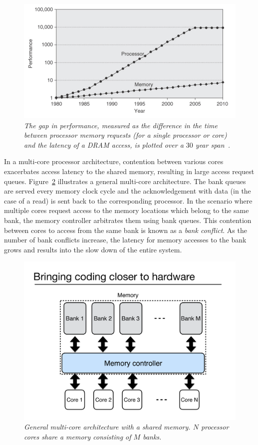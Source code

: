 \begin{figure}[t!]
\centering
\includegraphics[width=0.7\linewidth]{fig/cpuvsmemory.jpg}
\caption{\it{The gap in performance, measured as the difference in the time 
between processor memory requests (for a single processor or core) and the 
latency of a DRAM access, is plotted over a $30$ year span~\cite{comparchbook}.}}
\label{fig:cpuvsmemory}
\end{figure}
In a multi-core processor architecture, contention between various cores exacerbates access latency to the shared memory, resulting in large access request queues. 
Figure~\ref{fig:multicore_arch}  illustrates a general multi-core architecture. The bank queues are 
served every memory clock cycle and the acknowledgement with data (in the case of a 
read) is sent back to the corresponding processor. In the scenario where multiple cores request access to the memory locations which belong to the same bank, the memory controller arbitrates them using bank queues. This contention between cores to access from the same bank is known as a {\em bank conflict}. 
As the number of bank conflicts increase, the latency for memory accesses to the bank grows and results into the slow down of the entire system. \\ 
\begin{figure}[t!]
\centering
\includegraphics[width=0.6\linewidth]{fig/multicore-sys.pdf}
\caption{\it{General multi-core architecture with a shared memory. $N$ processor cores share a memory consisting of $M$ banks.}}
\label{fig:multicore_arch}
\end{figure}
